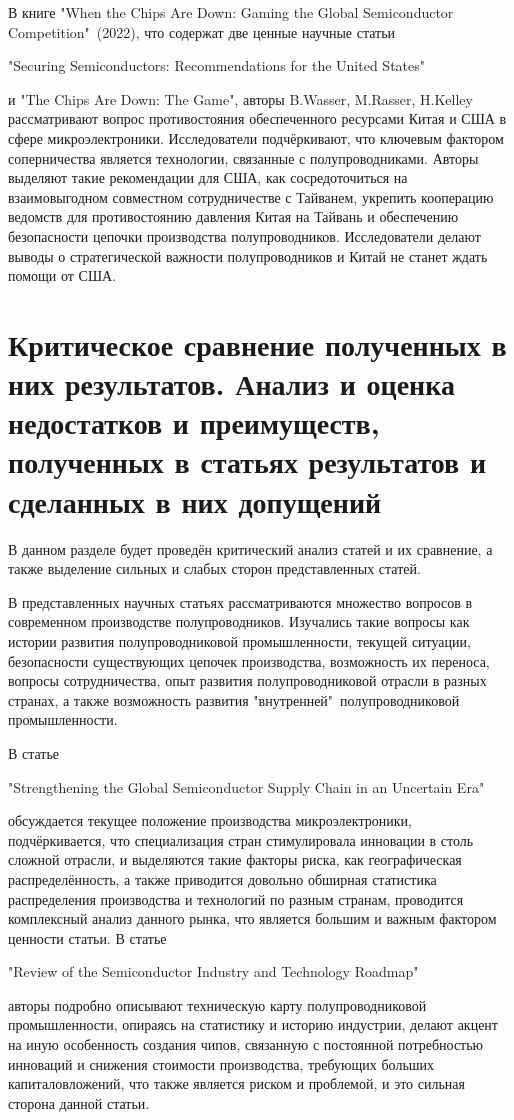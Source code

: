 \documentclass[14pt, a4paper]{extarticle}
\begin{document}
В книге "When the Chips Are Down: Gaming the Global Semiconductor Competition"\ (2022), что содержат две ценные научные статьи \begin{english}  "Securing Semiconductors: Recommendations for the United States"\end{english}  и "The Chips Are Down: The Game", авторы B.Wasser, M.Rasser, H.Kelley рассматривают вопрос противостояния обеспеченного ресурсами Китая и США в сфере микроэлектроники. Исследователи подчёркивают, что ключевым фактором соперничества является технологии, связанные с полупроводниками. Авторы выделяют такие рекомендации для США, как сосредоточиться на взаимовыгодном совместном сотрудничестве с Тайванем, укрепить кооперацию ведомств для противостоянию давления Китая на Тайвань и обеспечению безопасности цепочки производства полупроводников. Исследователи делают выводы о стратегической важности полупроводников и Китай не станет ждать помощи от США. 

\newpage 
\section{Критическое сравнение полученных в них результатов. Анализ и оценка недостатков и преимуществ, полученных в статьях результатов и сделанных в них допущений}
В данном разделе будет проведён критический анализ статей и их сравнение, а также выделение сильных и слабых сторон представленных статей. 

В представленных научных статьях рассматриваются множество вопросов в современном производстве полупроводников. Изучались такие вопросы как истории развития полупроводниковой промышленности, текущей ситуации, безопасности существующих цепочек производства, возможность их переноса, вопросы сотрудничества, опыт развития полупроводниковой отрасли в разных странах, а также возможность развития "внутренней"\ полупроводниковой промышленности.

В статье \begin{english} "Strengthening the Global Semiconductor Supply Chain in an Uncertain Era"\end{english} обсуждается текущее положение производства микроэлектроники, подчёркивается, что специализация стран стимулировала инновации в столь сложной отрасли, и выделяются такие факторы риска, как географическая распределённость, а также приводится довольно обширная статистика распределения производства и технологий по разным странам, проводится комплексный анализ данного рынка, что является большим и важным фактором ценности статьи. В статье \begin{english} "Review of the Semiconductor Industry and Technology Roadmap"\end{english} авторы подробно описывают техническую карту полупроводниковой промышленности, опираясь на статистику и историю индустрии, делают акцент на иную особенность создания чипов, связанную с постоянной потребностью инноваций и снижения стоимости производства, требующих больших капиталовложений, что также является риском и проблемой, и это сильная сторона данной статьи.
\end{document}

